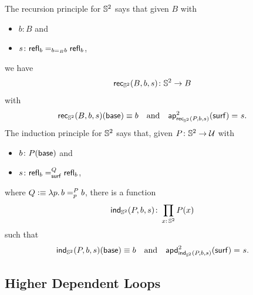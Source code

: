 The recursion principle for $\mathbb S^2$ says that given $B$ with
\begin{itemize}
    \item $b\colon B$ and
    \item $s\colon\fun{refl}_b\eq{b\eq{B}b}\fun{refl}_b$,
\end{itemize}
we have
\[
    \fun{rec}_{\sphere^2}(B,b,s)\colon\sphere^2\to B
\]
with
\[
    \mathsf{rec}_{\mathbb S^2}(B,b,s)(\mathsf{base})\equiv b
    \quad\text{and}\quad
    \mathsf{ap}^2_{\mathsf{rec}_{\mathbb S^2}(P,b,s)}(\mathsf{surf})\mathrel{=_{}}s.
\]
The induction principle for $\mathbb S^2$ says that, given $P\colon\sphere^2\to\univ$ with
\begin{itemize}
    \item $b\colon P(\fun{base})$ and 
    \item $s\colon\fun{refl}_b\eqt{\fun{surf}}Q\fun{refl}_b$,
\end{itemize}
where $Q\mathrel{\vcentcolon}\equiv\lambda p.\,b=_{p}^{P}b$, there is a function 
\[
    \fun{ind}_{\sphere^2}(P,b,s)\colon
        \prod_{x\colon\sphere^2}P(x)
\]
such that
\[
    \mathsf{ind}_{\mathbb S^2}(P,b,s)(\mathsf{base})\equiv b
    \quad\text{and}\quad
    \mathsf{apd}^2_{\mathsf{ind}_{\mathbb S^2}(P,b,s)}(\mathsf{surf})\mathrel{=_{}}s.
\]

\subsection{Higher Dependent Loops}\label{n-spheres}

